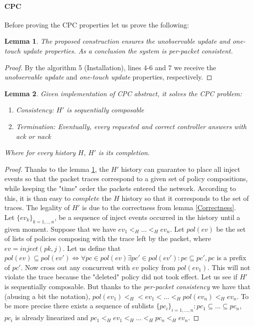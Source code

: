\documentclass{article}
\newtheorem{lemma}{Lemma}
\theoremstyle{remark}
\begin{document}
\paragraph{CPC}
Before proving the CPC properties let us prove the following:
\begin{lemma}\label{per-packet consistency} The proposed construction ensures the \emph{unobservable update} and \emph{one-touch update} properties. As a conclusion the system is \emph{per-packet consistent}.
\end{lemma}
\begin{proof}
By the algorithm 5 (Installation), lines 4-6 and 7 we receive the \emph{unobservable update} and \emph{one-touch update} properties, respectively.
\end{proof}
\begin{lemma}
Given implementation of CPC abstract, it solves the CPC problem:
\begin{enumerate}
\item Consistency: \emph{$H'$ is sequentially composable}
\item Termination: \emph{Eventually, every requested and correct controller answers with} ack or nack
\end{enumerate}
Where for every history $H$, $H'$ is its completion.
\end{lemma}
\begin{proof}
Thanks to the lemma \ref{per-packet consistency}, the $H'$ history can guarantee to place all inject events so that the packet traces correspond to a given set of policy compositions, while keeping the "time" order the packets entered the network. According to this, it is than easy to $complete$ the $H$ history so that it corresponds to the set of traces.
The legality of $H'$ is due to the correctness from lemma \ref{Correctness}. \\
Let $\lbrace ev_k\rbrace_{k=1,..,n}$, be a sequence of 
inject events occurred in the history until a given moment. Suppose 
that we have $ev_1<_H\ldots <_Hev_n$.
Let $pol(ev)$ be the set of lists of policies composing with the trace left by the packet, where $ev=inject(pk,j)$. Let us define that $pol(ev)\subseteq pol(ev')\Leftrightarrow \forall pc\in pol(ev) \exists pc'\in pol(ev'): pc\subseteq pc',pc$ is a prefix of $pc'$. Now cross out any concurrent with $ev$ policy from $pol(ev_1)$. This will not violate the trace because the "deleted" policy did not took effect. 
Let us see if $H'$ is sequentially composable. But thanks to the \emph{per-packet consistency} we have that (abusing a bit the notation), $pol(ev_1)<_H<ev_1<\ldots <_H pol(ev_n)<_Hev_n$. To be more precise there exists a sequence of sublists $\lbrace pc_i\rbrace_{i=1,\ldots, n}: pc_1\subseteq\ldots\subseteq pc_n$,  $pc_i$ is already linearized and $pc_1<_H ev_1<_H\ldots <_H pc_n<_H ev_n$. 
\end{proof}
\end{document}
